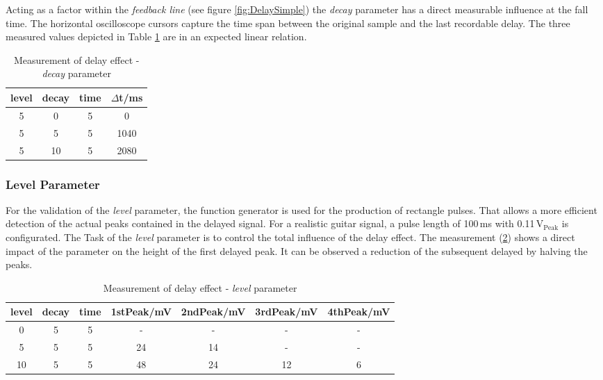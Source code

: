 Acting as a factor within the \textit{feedback line} (see figure \ref{fig:DelaySimple}) the \textit{decay} parameter has a direct measurable influence at the fall time. The horizontal oscilloscope cursors capture the time span between the original sample and the last recordable delay. The three measured values depicted in Table \ref{tab:decay parameter} are in an expected linear relation.

\begin{table}[H]
\begin{center}
\begin{tabular}{|c|c|c||c|}
\hline 
\textbf{level} & \textbf{decay} & \textbf{time} & $\Delta$t/ms \\ 
\hline 
\hline
5 & 0 & 5 & 0 \\ 
\hline 
5 & 5 & 5 & 1040 \\ 
\hline 
5 & 10 & 5 & 2080 \\ 
\hline 
\end{tabular} 
\end{center}
\caption{Measurement of delay effect - \textit{decay} parameter}
\label{tab:decay parameter}
\end{table}



\subsubsection{Level Parameter}

For the validation of the \textit{level} parameter, the function generator is used for the production of rectangle pulses.
That allows a more efficient detection of the actual peaks contained in the delayed signal.
For a realistic guitar signal, a pulse length of 100\,ms with 0.11\,V$_{\mathrm{Peak}}$ is configurated.
The Task of the \textit{level} parameter is to control the total influence of the delay effect.
The measurement (\ref{tab:level parameter}) shows a direct impact of the parameter on the height of the first delayed peak. It can be observed a reduction of the subsequent delayed by halving the peaks.


\begin{table}[H]
\begin{center}
\begin{tabular}{|c|c|c||c|c|c|c|}
\hline 
\textbf{level} & \textbf{decay} & \textbf{time} & 1stPeak/mV & 2ndPeak/mV & 3rdPeak/mV & 4thPeak/mV\\ 
\hline 
\hline 
0 & 5 & 5 & - & - & - & - \\ 
\hline 
5 & 5 & 5 & 24 & 14 & - & -\\ 
\hline 
10 & 5 & 5 & 48 & 24 & 12 & 6 \\ 
\hline 
\end{tabular} 
\end{center}
\caption{Measurement of delay effect - \textit{level} parameter}
\label{tab:level parameter}
\end{table}

